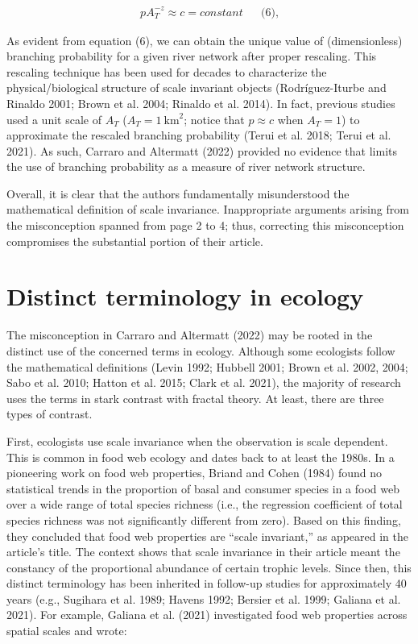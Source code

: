 \documentclass[
  12pt,
]{article}
\begin{document}
\[
\begin{aligned}
p A_T^{-z} \approx c = constant &&\text{(6),}
\end{aligned}
\]

As evident from equation (6), we can obtain the unique value of (dimensionless) branching probability for a given river network after proper rescaling. This rescaling technique has been used for decades to characterize the physical/biological structure of scale invariant objects (Rodríguez-Iturbe and Rinaldo 2001; Brown et al. 2004; Rinaldo et al. 2014). In fact, previous studies used a unit scale of \(A_T\) (\(A_T = 1~\text{km}^2\); notice that \(p \approx c\) when \(A_T = 1\)) to approximate the rescaled branching probability (Terui et al. 2018; Terui et al. 2021). As such, Carraro and Altermatt (2022) provided no evidence that limits the use of branching probability as a measure of river network structure.

Overall, it is clear that the authors fundamentally misunderstood the mathematical definition of scale invariance. Inappropriate arguments arising from the misconception spanned from page 2 to 4; thus, correcting this misconception compromises the substantial portion of their article.

\hypertarget{distinct-terminology-in-ecology}{%
\section{Distinct terminology in ecology}\label{distinct-terminology-in-ecology}}

The misconception in Carraro and Altermatt (2022) may be rooted in the distinct use of the concerned terms in ecology. Although some ecologists follow the mathematical definitions (Levin 1992; Hubbell 2001; Brown et al. 2002, 2004; Sabo et al. 2010; Hatton et al. 2015; Clark et al. 2021), the majority of research uses the terms in stark contrast with fractal theory. At least, there are three types of contrast.

First, ecologists use scale invariance when the observation is scale dependent. This is common in food web ecology and dates back to at least the 1980s. In a pioneering work on food web properties, Briand and Cohen (1984) found no statistical trends in the proportion of basal and consumer species in a food web over a wide range of total species richness (i.e., the regression coefficient of total species richness was not significantly different from zero). Based on this finding, they concluded that food web properties are ``scale invariant,'' as appeared in the article's title. The context shows that scale invariance in their article meant the constancy of the proportional abundance of certain trophic levels. Since then, this distinct terminology has been inherited in follow-up studies for approximately 40 years (e.g., Sugihara et al. 1989; Havens 1992; Bersier et al. 1999; Galiana et al. 2021). For example, Galiana et al. (2021) investigated food web properties across spatial scales and wrote:
\end{document}
